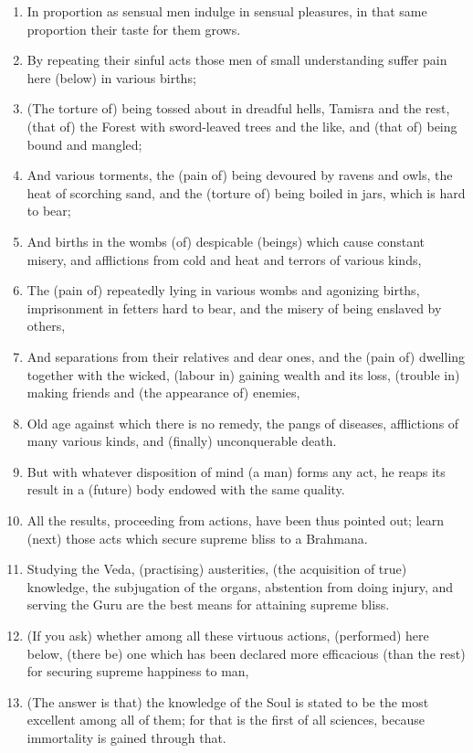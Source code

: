 \begin{enumerate}
\item In proportion as sensual men indulge in sensual pleasures, in that same proportion their taste for them grows.
\item By repeating their sinful acts those men of small understanding suffer pain here (below) in various births;
\item (The torture of) being tossed about in dreadful hells, Tamisra and the rest, (that of) the Forest with sword-leaved trees and the like, and (that of) being bound and mangled;
\item And various torments, the (pain of) being devoured by ravens and owls, the heat of scorching sand, and the (torture of) being boiled in jars, which is hard to bear;
\item And births in the wombs (of) despicable (beings) which cause constant misery, and afflictions from cold and heat and terrors of various kinds,
\item The (pain of) repeatedly lying in various wombs and agonizing births, imprisonment in fetters hard to bear, and the misery of being enslaved by others,
\item And separations from their relatives and dear ones, and the (pain of) dwelling together with the wicked, (labour in) gaining wealth and its loss, (trouble in) making friends and (the appearance of) enemies,
\item Old age against which there is no remedy, the pangs of diseases, afflictions of many various kinds, and (finally) unconquerable death.
\item But with whatever disposition of mind (a man) forms any act, he reaps its result in a (future) body endowed with the same quality.
\item All the results, proceeding from actions, have been thus pointed out; learn (next) those acts which secure supreme bliss to a Brahmana.
\item Studying the Veda, (practising) austerities, (the acquisition of true) knowledge, the subjugation of the organs, abstention from doing injury, and serving the Guru are the best means for attaining supreme bliss.
\item (If you ask) whether among all these virtuous actions, (performed) here below, (there be) one which has been declared more efficacious (than the rest) for securing supreme happiness to man,
\item (The answer is that) the knowledge of the Soul is stated to be the most excellent among all of them; for that is the first of all sciences, because immortality is gained through that.

\end{enumerate}
